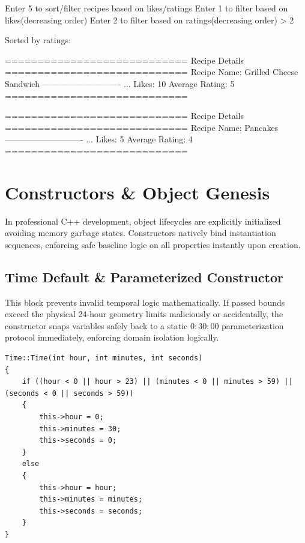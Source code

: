 \documentclass[12pt, a4paper]{article}
\begin{document}
\begin{terminalbox}
Enter 5 to sort/filter recipes based on likes/ratings
Enter 1 to filter based on likes(decreasing order)
Enter 2 to filter based on ratings(decreasing order)
> 2

Sorted by ratings:

============================
       Recipe Details       
============================
 Recipe Name: Grilled Cheese Sandwich
----------------------------
...
 Likes: 10
 Average Rating: 5
============================

============================
       Recipe Details       
============================
 Recipe Name: Pancakes
----------------------------
...
 Likes: 5
 Average Rating: 4
============================
\end{terminalbox}

\newpage

\section{Constructors \& Object Genesis}

In professional C++ development, object lifecycles are explicitly initialized avoiding memory garbage states. Constructors natively bind instantiation sequences, enforcing safe baseline logic on all properties instantly upon creation.

\subsection{Time Default \& Parameterized Constructor}
This block prevents invalid temporal logic mathematically. If passed bounds exceed the physical 24-hour geometry limits maliciously or accidentally, the constructor snaps variables safely back to a static $0:30:00$ parameterization protocol immediately, enforcing domain isolation logically.

\begin{lstlisting}[caption={Time Default Parameter Initialization}]
Time::Time(int hour, int minutes, int seconds)
{
    if ((hour < 0 || hour > 23) || (minutes < 0 || minutes > 59) || (seconds < 0 || seconds > 59))
    {
        this->hour = 0;
        this->minutes = 30;
        this->seconds = 0;
    }
    else
    {
        this->hour = hour;
        this->minutes = minutes;
        this->seconds = seconds;
    }
}
\end{lstlisting}
\end{document}
